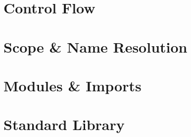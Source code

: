 \documentclass{article}
\begin{document}
    \section{Control Flow}

    \section{Scope \& Name Resolution}\label{sec:scope}

    \section{Modules \& Imports}

    \section{Standard Library}
\end{document}
